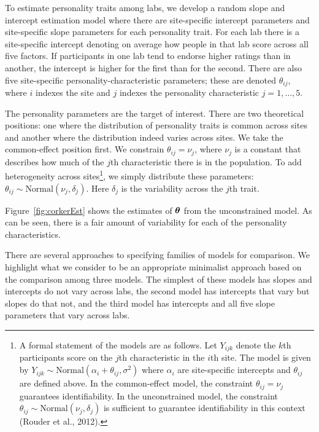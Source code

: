 \documentclass[english,man]{apa6}
\theoremstyle{definition}
\theoremstyle{definition}
\theoremstyle{definition}
\theoremstyle{remark}
\begin{document}
To estimate personality traits among labs, we develop a random slope and
intercept estimation model where there are site-specific intercept
parameters and site-specific slope parameters for each personality
trait. For each lab there is a site-specific intercept denoting on
average how people in that lab score across all five factors. If
participants in one lab tend to endorse higher ratings than in another,
the intercept is higher for the first than for the second. There are
also five site-specific personality-characteristic parameters; these are
denoted \(\theta_{ij}\), where \(i\) indexes the site and \(j\) indexes
the personality characteristic \(j=1,\ldots,5\).

The personality parameters are the target of interest. There are two
theoretical positions: one where the distribution of personality traits
is common across sites and another where the distribution indeed varies
across sites. We take the common-effect position first. We constrain
\(\theta_{ij}=\nu_j\), where \(\nu_j\) is a constant that describes how
much of the \(j\)th characteristic there is in the population. To add
heterogeneity across sites\footnote{A formal statement of the models are
  as follows. Let \(Y_{ijk}\) denote the \(k\)th participants score on
  the \(j\)th characteristic in the \(i\)th site. The model is given by
  \(Y_{ijk} \sim \mbox{Normal}(\alpha_i+\theta_{ij},\sigma^2)\) where
  \(\alpha_i\) are site-specific intercepts and \(\theta_{ij}\) are
  defined above. In the common-effect model, the constraint
  \(\theta_{ij}=\nu_j\) guarantees identifiability. In the unconstrained
  model, the constraint
  \(\theta_{ij} \sim \mbox{Normal}(\nu_j,\delta_j)\) is sufficient to
  guarantee identifiability in this context (Rouder et al., 2012).}, we
simply distribute these parameters:
\(\theta_{ij} \sim \mbox{Normal}(\nu_j,\delta_j)\). Here \(\delta_j\) is
the variability across the \(j\)th trait.

Figure~\ref{fig:corkerEst} shows the estimates of \(\bm \theta\) from the
unconstrained model. As can be seen, there is a fair amount of
variability for each of the personality characteristics.

There are several approaches to specifying families of models for
comparison. We highlight what we consider to be an appropriate
minimalist approach based on the comparison among three models. The
simplest of these models has slopes and intercepts do not vary across
labs, the second model has intercepts that vary but slopes do that not,
and the third model has intercepts and all five slope parameters that
vary across labs.
\end{document}

